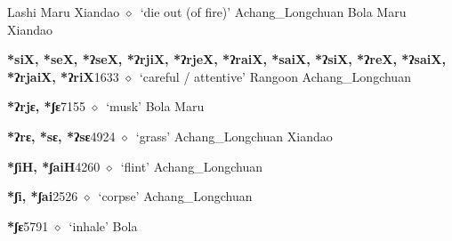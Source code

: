 \begin{list}{}{\leftmargin=1.5em \itemindent=-1.5em}
\hspace{1ex}
         Lashi 
\hspace{1ex}
         Maru 
\hspace{1ex}
         Xiandao 
\hspace{1ex}
         $\diamond$~`die out (of fire)'
         Achang\_Longchuan 
\hspace{1ex}
         Bola 
\hspace{1ex}
         Maru 
\hspace{1ex}
         Xiandao 
  \item {\footnotesize \textbf{*siX, *seX, *ʔseX, *ʔrjiX, *ʔrjeX, *ʔraiX, *saiX, *ʔsiX, *ʔreX, *ʔsaiX, *ʔrjaiX, *ʔriX}}{\tiny 1633}
\hspace{1ex}
         $\diamond$~`careful / attentive'
         Rangoon 
\hspace{1ex}
         Achang\_Longchuan 
  \item {\footnotesize \textbf{*ʔrjɛ, *ʃɛ}}{\tiny 7155}
\hspace{1ex}
         $\diamond$~`musk'
         Bola 
\hspace{1ex}
         Maru 
  \item {\footnotesize \textbf{*ʔrɛ, *sɛ, *ʔsɛ}}{\tiny 4924}
\hspace{1ex}
         $\diamond$~`grass'
         Achang\_Longchuan 
\hspace{1ex}
         Xiandao 
  \item {\footnotesize \textbf{*ʃiH, *ʃaiH}}{\tiny 4260}
\hspace{1ex}
         $\diamond$~`flint'
         Achang\_Longchuan 
  \item {\footnotesize \textbf{*ʃi, *ʃai}}{\tiny 2526}
\hspace{1ex}
         $\diamond$~`corpse'
         Achang\_Longchuan 
  \item {\footnotesize \textbf{*ʃɛ}}{\tiny 5791}
\hspace{1ex}
         $\diamond$~`inhale'
         Bola 

\end{list}
